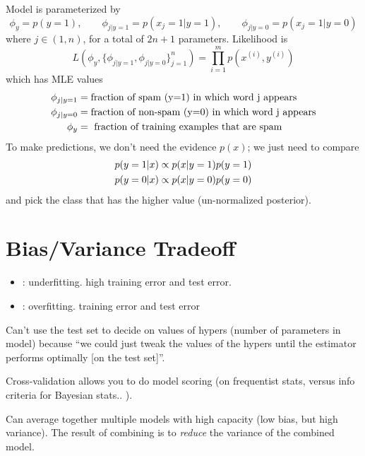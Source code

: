 \documentclass[11pt]{article}
\begin{document}
Model is parameterized by
\begin{equation}
  \phi_y = p(y=1),\qquad \phi_{j|y=1} = p(x_j=1|y=1), \qquad \phi_{j|y=0} = p(x_j=1|y=0)
\end{equation}
where $j \in (1, n)$, for a total of $2n +1$ parameters. Likelihood is
\begin{equation}
  L(\phi_y, \{\phi_{j|y=1}, \phi_{j|y=0}\}_{j=1}^n) = \prod_{i=1}^m p(x^{(i)}, y^{(i)})
\end{equation}
which has MLE values
\begin{align}
  \phi_{j|y=1} &= \textrm{fraction of spam (y=1) in which word j appears}\nonumber\\
  \phi_{j|y=0} &= \textrm{fraction of non-spam (y=0) in which word j appears}\nonumber\\
  \phi_{y}     &= \textrm{ fraction of training examples that are spam}
\end{align}
To make predictions, we don't need the evidence $p(x)$; we just need to compare
\begin{align}
  p(y=1|x) &\propto p(x|y=1)p(y=1)\nonumber\\
  p(y=0|x) &\propto p(x|y=0)p(y=0)
\end{align}
and pick the class that has the higher value (un-normalized posterior).




\section{Bias/Variance Tradeoff}
\label{sec:bias_var}
\begin{itemize}
  \item {}: underfitting. high training error and test error.
  \item {}: overfitting.  training error and
   test error
\end{itemize}

Can't use the test set to decide on values of hypers (\eeg number of parameters in
model) because ``we could just tweak the values of the hypers until the estimator
performs optimally [on the test set]''.

Cross-validation allows you to do model scoring (on frequentist stats, versus \eeg info
criteria for Bayesian stats.. ).

Can average together multiple models with high capacity (low bias, but high
variance). The result of combining is to \emph{reduce} the variance of the combined
model.
\end{document}
